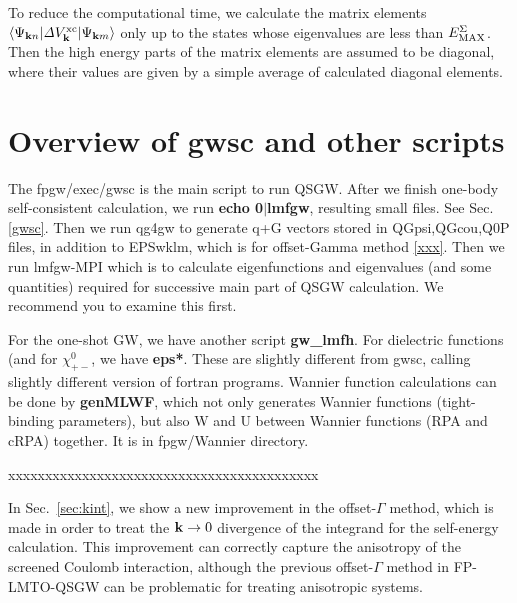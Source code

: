 \documentclass[a4paper,10pt,fleqn]{article}
\def\Psikn{\Psi_{{\bf k}n}}
\def\Dvxc{{\it \Delta} V^{\rm xc}}
\def\Psikn{{\Psi_{{\bf k}n}}}
\def\Psikm{{\Psi_{{\bf k}m}}}
\def\EMAXS{E_{\rm MAX}^\Sigma}
\newcommand{\bfk}{{\bf k}}
\newcommand{\exe}[1]{{\bf #1}}
\newcommand{\io}[1]{{\sf  #1}}
\begin{document}
To reduce the computational time,
we calculate the matrix elements $\langle \Psikn |\Dvxc_\bfk | \Psikm \rangle$ only up to the states whose
eigenvalues are less than $\EMAXS$. 
Then the high energy parts of the matrix elements are assumed 
to be diagonal, where their values are given by a simple average 
of calculated diagonal elements.




\section{Overview of gwsc and other scripts}
The fpgw/exec/gwsc is the main script to run QSGW.
After we finish one-body self-consistent calculation, 
we run \exe{echo 0$|$lmfgw}, resulting small files.
See Sec.\ref{gwsc}. Then we run qg4gw to generate q+G vectors
stored in \io{QGpsi,QGcou,Q0P} files, in addition to EPSwklm, which is for offset-Gamma method \ref{xxx}.
Then we run lmfgw-MPI which is to calculate eigenfunctions
and eigenvalues (and some quantities) required for successive
main part of QSGW calculation.
We recommend you to examine this first.

For the one-shot GW, we have another script \exe{gw\_lmfh}.
For dielectric functions (and for $\chi_{+-}^0$, we have \exe{eps*}.
These are slightly different from gwsc, calling
slightly different version of fortran programs.
Wannier function calculations can be done by \exe{genMLWF},
which not only generates Wannier functions (tight-binding parameters), 
but also W and U between Wannier functions (RPA and cRPA) together. 
It is in \io{fpgw/Wannier} directory.


xxxxxxxxxxxxxxxxxxxxxxxxxxxxxxxxxxxxxxxxxx


In Sec.~\ref{sec:kint}, we show a new improvement in the offset-$\Gamma$ method, which is
made in order to treat the $\bfk \to 0$ divergence of the integrand for the self-energy calculation.
This improvement can correctly capture the anisotropy of the screened Coulomb interaction,
although the previous offset-$\Gamma$ method in FP-LMTO-QSGW \cite{kotani_quasiparticle_2007}
can be problematic for treating anisotropic systems.
\end{document}
